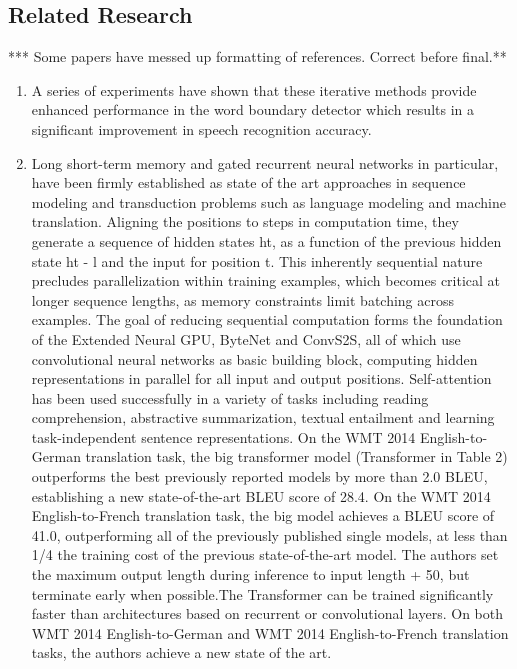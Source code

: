 \documentclass[11pt]{article}
\begin{document}
\subsection{Related Research}

*** Some papers have messed up formatting of references. Correct before final.**
\begin{enumerate}
    \item A series of experiments have shown that these iterative methods provide enhanced performance in the word boundary detector which results in a significant improvement in speech recognition accuracy.\cite{chung}
    \item Long short-term memory\cite{lstm} and gated recurrent\cite{recurrent} neural networks in particular, have been firmly established as state of the art approaches in sequence modeling and transduction problems such as language modeling and machine translation.
    Aligning the positions to steps in computation time, they generate a sequence of hidden states ht, as a function of the previous hidden state ht - l and the input for position t. This inherently sequential nature precludes parallelization within training examples, which becomes critical at longer sequence lengths, as memory constraints limit batching across examples.
    The goal of reducing sequential computation forms the foundation of the Extended Neural GPU, ByteNet and ConvS2S, all of which use convolutional neural networks as basic building block, computing hidden representations in parallel for all input and output positions.
    Self-attention has been used successfully in a variety of tasks including reading comprehension, abstractive summarization, textual entailment and learning task-independent sentence representations. On the WMT 2014 English-to-German translation task, the big transformer model (Transformer in Table 2) outperforms the best previously reported models by more than 2.0 BLEU, establishing a new state-of-the-art BLEU score of 28.4.
    On the WMT 2014 English-to-French translation task, the big model achieves a BLEU score of 41.0, outperforming all of the previously published single models, at less than 1/4 the training cost of the previous state-of-the-art model.
    The authors set the maximum output length during inference to input length + 50, but terminate early when possible\cite{schuster}.The Transformer can be trained significantly faster than architectures based on recurrent or convolutional layers.
    On both WMT 2014 English-to-German and WMT 2014 English-to-French translation tasks, the authors achieve a new state of the art.

\end{enumerate}
\end{document}

